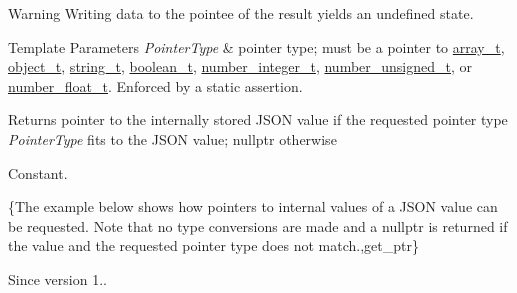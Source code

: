 \begin{DoxyWarning}{Warning}
Writing data to the pointee of the result yields an undefined state.
\end{DoxyWarning}

\begin{DoxyTemplParams}{Template Parameters}
{\em Pointer\+Type} & pointer type; must be a pointer to \hyperlink{classnlohmann_1_1basic__json_ab00b882d39306d663c23dab110f5cae0}{array\+\_\+t}, \hyperlink{classnlohmann_1_1basic__json_a0ac9894c9de8dc551cf2e5f1c605537f}{object\+\_\+t}, \hyperlink{classnlohmann_1_1basic__json_ab63e618bbb0371042b1bec17f5891f42}{string\+\_\+t}, \hyperlink{classnlohmann_1_1basic__json_af3bc3e83aa162d7ba4df16a949872723}{boolean\+\_\+t}, \hyperlink{classnlohmann_1_1basic__json_ac4b10b2364f26ce47bdb9a413ff04a59}{number\+\_\+integer\+\_\+t}, \hyperlink{classnlohmann_1_1basic__json_a60a04166c122072ab11eaf9845d9cd1d}{number\+\_\+unsigned\+\_\+t}, or \hyperlink{classnlohmann_1_1basic__json_a74a0013e847fdc574b48f931f0e757e1}{number\+\_\+float\+\_\+t}. Enforced by a static assertion.\\
\hline
\end{DoxyTemplParams}
\begin{DoxyReturn}{Returns}
pointer to the internally stored J\+S\+ON value if the requested pointer type {\itshape Pointer\+Type} fits to the J\+S\+ON value; {\ttfamily nullptr} otherwise
\end{DoxyReturn}
Constant.

\{The example below shows how pointers to internal values of a J\+S\+ON value can be requested. Note that no type conversions are made and a {\ttfamily nullptr} is returned if the value and the requested pointer type does not match.,get\+\_\+ptr\}

\begin{DoxySince}{Since}
version 1.. 
\end{DoxySince}
\hypertarget{classnlohmann_1_1basic__json_a4f332e90f3cae562d0c3fa6ba48f74f9}{}\label{classnlohmann_1_1basic__json_a4f332e90f3cae562d0c3fa6ba48f74f9} 

